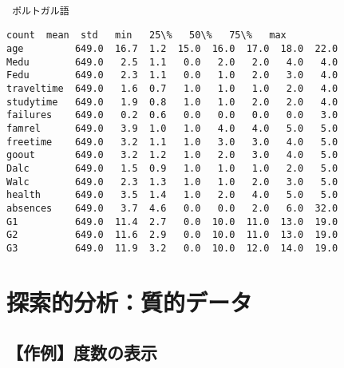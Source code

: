 \documentclass[9pt]{ltjsarticle}
\begin{document}
    
    \begin{Verbatim}[commandchars=\\\{\}]

 ポルトガル語
    \end{Verbatim}

    
    \begin{Verbatim}[commandchars=\\\{\}]
            count  mean  std   min   25\%   50\%   75\%   max
age         649.0  16.7  1.2  15.0  16.0  17.0  18.0  22.0
Medu        649.0   2.5  1.1   0.0   2.0   2.0   4.0   4.0
Fedu        649.0   2.3  1.1   0.0   1.0   2.0   3.0   4.0
traveltime  649.0   1.6  0.7   1.0   1.0   1.0   2.0   4.0
studytime   649.0   1.9  0.8   1.0   1.0   2.0   2.0   4.0
failures    649.0   0.2  0.6   0.0   0.0   0.0   0.0   3.0
famrel      649.0   3.9  1.0   1.0   4.0   4.0   5.0   5.0
freetime    649.0   3.2  1.1   1.0   3.0   3.0   4.0   5.0
goout       649.0   3.2  1.2   1.0   2.0   3.0   4.0   5.0
Dalc        649.0   1.5  0.9   1.0   1.0   1.0   2.0   5.0
Walc        649.0   2.3  1.3   1.0   1.0   2.0   3.0   5.0
health      649.0   3.5  1.4   1.0   2.0   4.0   5.0   5.0
absences    649.0   3.7  4.6   0.0   0.0   2.0   6.0  32.0
G1          649.0  11.4  2.7   0.0  10.0  11.0  13.0  19.0
G2          649.0  11.6  2.9   0.0  10.0  11.0  13.0  19.0
G3          649.0  11.9  3.2   0.0  10.0  12.0  14.0  19.0
    \end{Verbatim}

    \newpage
    \hypertarget{ux63a2ux7d22ux7684ux5206ux6790ux8ceaux7684ux30c7ux30fcux30bf}{%
\section{探索的分析：質的データ}\label{ux63a2ux7d22ux7684ux5206ux6790ux8ceaux7684ux30c7ux30fcux30bf}}

    \hypertarget{ux4f5cux4f8bux5ea6ux6570ux306eux8868ux793a}{%
\subsection{【作例】度数の表示}\label{ux4f5cux4f8bux5ea6ux6570ux306eux8868ux793a}}
\end{document}
